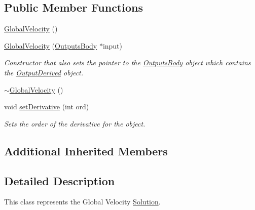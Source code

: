 \subsection*{Public Member Functions}
\begin{DoxyCompactItemize}
\item 
\hyperlink{classosea_1_1ofreq_1_1_global_velocity_a444ab39b351acd4e6ca7dc8088e2a9b8}{Global\-Velocity} ()
\item 
\hyperlink{classosea_1_1ofreq_1_1_global_velocity_a7992180d42ae3558cdcccfe56550ed94}{Global\-Velocity} (\hyperlink{classosea_1_1ofreq_1_1_outputs_body}{Outputs\-Body} $\ast$input)
\begin{DoxyCompactList}\small\item\em Constructor that also sets the pointer to the \hyperlink{classosea_1_1ofreq_1_1_outputs_body}{Outputs\-Body} object which contains the \hyperlink{classosea_1_1ofreq_1_1_output_derived}{Output\-Derived} object. \end{DoxyCompactList}\item 
\hyperlink{classosea_1_1ofreq_1_1_global_velocity_a2b8f719180b1786a582d90603db8f2d8}{$\sim$\-Global\-Velocity} ()
\item 
void \hyperlink{classosea_1_1ofreq_1_1_global_velocity_a11229a6dbc7f85f3c321b5eddb127f10}{set\-Derivative} (int ord)
\begin{DoxyCompactList}\small\item\em Sets the order of the derivative for the object. \end{DoxyCompactList}\end{DoxyCompactItemize}
\subsection*{Additional Inherited Members}


\subsection{Detailed Description}
This class represents the Global Velocity \hyperlink{classosea_1_1ofreq_1_1_solution}{Solution}. 

